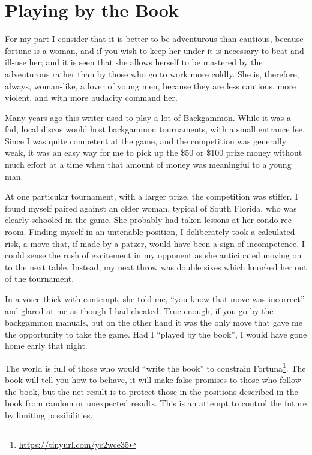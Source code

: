 \section{Playing by the Book}

\begin{quotex}
For my part I consider that it is better to be adventurous than cautious, because fortune is a woman, and if you wish to keep her under it is necessary to beat and ill-use her; and it is seen that she allows herself to be mastered by the adventurous rather than by those who go to work more coldly. She is, therefore, always, woman-like, a lover of young men, because they are less cautious, more violent, and with more audacity command her.
\end{quotex}

Many years ago this writer used to play a lot of Backgammon. While it was a fad, local discos would host backgammon tournaments, with a small entrance fee. Since I was quite competent at the game, and the competition was generally weak, it was an easy way for me to pick up the \$50 or \$100 prize money without much effort at a time when that amount of money was meaningful to a young man.

At one particular tournament, with a larger prize, the competition was stiffer. I found myself paired against an older woman, typical of South Florida, who was clearly schooled in the game. She probably had taken lessons at her condo rec room. Finding myself in an untenable position, I deliberately took a calculated risk, a move that, if made by a patzer, would have been a sign of incompetence. I could sense the rush of excitement in my opponent as she anticipated moving on to the next table. Instead, my next throw was double sixes which knocked her out of the tournament.

In a voice thick with contempt, she told me, ``you know that move was incorrect'' and glared at me as though I had cheated. True enough, if you go by the backgammon manuals, but on the other hand it was the only move that gave me the opportunity to take the game. Had I ``played by the book'', I would have gone home early that night.


The world is full of those who would ``write the book'' to constrain Fortuna\footnote{\url{https://tinyurl.com/yc2wce35}}. The book will tell you how to behave, it will make false promises to those who follow the book, but the net result is to protect those in the positions described in the book from random or unexpected results. This is an attempt to control the future by limiting possibilities.

